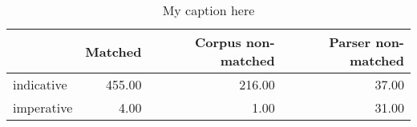 \begin{table}[!ht]
\centering
\begin{tabular}{lrrr}
\toprule
{} &  Matched &  Corpus non-matched &  Parser non-matched \\
\midrule
indicative &   455.00 &              216.00 &               37.00 \\
imperative &     4.00 &                1.00 &               31.00 \\
\bottomrule
\end{tabular}
\caption{My caption here}
\label{tab:MOOD-ocd-data}
\end{table}